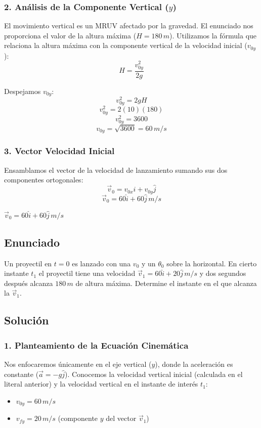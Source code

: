\documentclass[12pt, a4paper]{article}
\begin{document}
\subsubsection*{2. Análisis de la Componente Vertical ($y$)}
El movimiento vertical es un MRUV afectado por la gravedad. El enunciado nos proporciona el valor de la altura máxima ($H = 180 \, \si{m}$). 
Utilizamos la fórmula que relaciona la altura máxima con la componente vertical de la velocidad inicial ($v_{0y}$):
$$ H = \frac{v_{0y}^2}{2g} $$

Despejamos $v_{0y}$:
$$ v_{0y}^2 = 2gH $$
$$ v_{0y}^2 = 2(10)(180) $$
$$ v_{0y}^2 = 3600 $$
$$ v_{0y} = \sqrt{3600} = 60 \, \si{m/s} $$

\subsubsection*{3. Vector Velocidad Inicial}
Ensamblamos el vector de la velocidad de lanzamiento sumando sus dos componentes ortogonales:
$$ \vec{v}_0 = v_{0x}\hat{i} + v_{0y}\hat{j} $$
$$ \vec{v}_0 = 60\hat{i} + 60\hat{j} \, \si{m/s} $$

\begin{tcolorbox}[colback=green!5!white, colframe=green!50!black, title=Respuesta Final]
\centering \Large $\vec{v}_0 = 60\hat{i} + 60\hat{j} \, \si{m/s}$
\end{tcolorbox}

\newpage

\subsection*{Enunciado}
Un proyectil en $t = 0$ es lanzado con una $v_0$ y un $\theta_0$ sobre la horizontal. En cierto instante $t_1$ el proyectil tiene una velocidad $\vec{v}_1 = 60\hat{i} + 20\hat{j} \, \si{m/s}$ y dos segundos después alcanza $180 \, \si{m}$ de altura máxima. Determine el instante en el que alcanza la $\vec{v}_1$.

\subsection*{Solución}

\subsubsection*{1. Planteamiento de la Ecuación Cinemática}
Nos enfocaremos únicamente en el eje vertical ($y$), donde la aceleración es constante ($\vec{a} = -g\hat{j}$).
Conocemos la velocidad vertical inicial (calculada en el literal anterior) y la velocidad vertical en el instante de interés $t_1$:
\begin{itemize}
    \item $v_{0y} = 60 \, \si{m/s}$
    \item $v_{fy} = 20 \, \si{m/s}$ (componente $y$ del vector $\vec{v}_1$)
\end{itemize}
\end{document}
